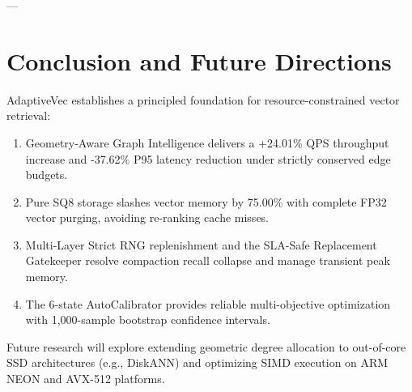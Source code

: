 \documentclass[10pt,journal,compsoc]{IEEEtran}
\begin{document}
---

\section{Conclusion and Future Directions}
\label{sec:conclusion}

AdaptiveVec establishes a principled foundation for resource-constrained vector retrieval:
\begin{enumerate}
    \item Geometry-Aware Graph Intelligence delivers a +24.01\% QPS throughput increase and -37.62\% P95 latency reduction under strictly conserved edge budgets.
    \item Pure SQ8 storage slashes vector memory by 75.00\% with complete FP32 vector purging, avoiding re-ranking cache misses.
    \item Multi-Layer Strict RNG replenishment and the SLA-Safe Replacement Gatekeeper resolve compaction recall collapse and manage transient peak memory.
    \item The 6-state AutoCalibrator provides reliable multi-objective optimization with 1,000-sample bootstrap confidence intervals.
\end{enumerate}

Future research will explore extending geometric degree allocation to out-of-core SSD architectures (e.g., DiskANN) and optimizing SIMD execution on ARM NEON and AVX-512 platforms.



\end{document}
